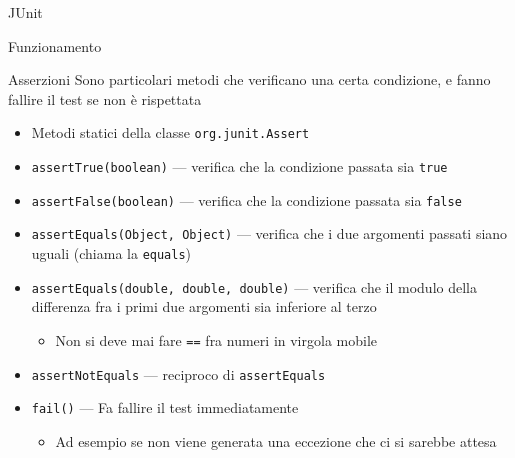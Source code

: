 \documentclass[presentation]{beamer}
\begin{document}
\begin{frame}[allowframebreaks]{JUnit}
\begin{block}{Funzionamento}
\begin{itemize}
		\end{itemize}
	\end{block}
	\begin{block}{Asserzioni}
		Sono particolari metodi che verificano una certa condizione, e fanno fallire il test se non è rispettata
		\begin{itemize}
			\item Metodi statici della classe \texttt{org.junit.Assert}
			\item \texttt{assertTrue(boolean)} --- verifica che la condizione passata sia \texttt{true}
			\item \texttt{assertFalse(boolean)} --- verifica che la condizione passata sia \texttt{false}
			\item \texttt{assertEquals(Object, Object)} --- verifica che i due argomenti passati siano uguali (chiama la \texttt{equals})
			\item \texttt{assertEquals(double, double, double)} --- verifica che il modulo della differenza fra i primi due argomenti sia inferiore al terzo
			\begin{itemize}
				\item Non si deve mai fare \texttt{==} fra numeri in virgola mobile
			\end{itemize}
			\item \texttt{assertNotEquals} --- reciproco di \texttt{assertEquals}
			\item \texttt{fail()} --- Fa fallire il test immediatamente
			\begin{itemize}
				\item Ad esempio se non viene generata una eccezione che ci si sarebbe attesa
			\end{itemize}
		\end{itemize}
	\end{block}
\end{frame}
\end{document}
